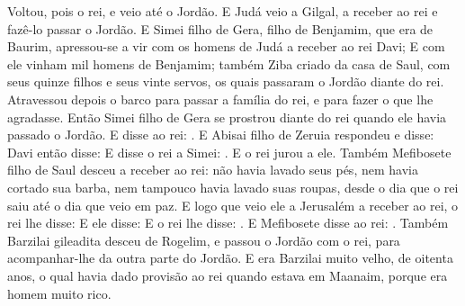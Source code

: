 {  Voltou, pois o rei, e veio até o Jordão. E Judá veio a Gilgal, a receber ao rei e fazê-lo passar o Jordão.
  E Simei filho de Gera, filho de Benjamim, que era de Baurim, apressou-se a vir com os homens de Judá a receber ao rei Davi;
  E com ele vinham mil homens de Benjamim; também Ziba criado da casa de Saul, com seus quinze filhos e seus vinte servos, os quais passaram o Jordão diante do rei.
  Atravessou depois o barco para passar a família do rei, e para fazer o que lhe agradasse. Então Simei filho de Gera se prostrou diante do rei quando ele havia passado o Jordão.
  E disse ao rei: .
  E Abisai filho de Zeruia respondeu e disse: 
  Davi então disse: 
  E disse o rei a Simei: . E o rei jurou a ele.
  Também Mefibosete filho de Saul desceu a receber ao rei: não havia lavado seus pés, nem havia cortado sua barba, nem tampouco havia lavado suas roupas, desde o dia que o rei saiu até o dia que veio em paz.
  E logo que veio ele a Jerusalém a receber ao rei, o rei lhe disse: 
  E ele disse: 
  E o rei lhe disse: .
  E Mefibosete disse ao rei: .
  Também Barzilai gileadita desceu de Rogelim, e passou o Jordão com o rei, para acompanhar-lhe da outra parte do Jordão.
  E era Barzilai muito velho, de oitenta anos, o qual havia dado provisão ao rei quando estava em Maanaim, porque era homem muito rico.
}
